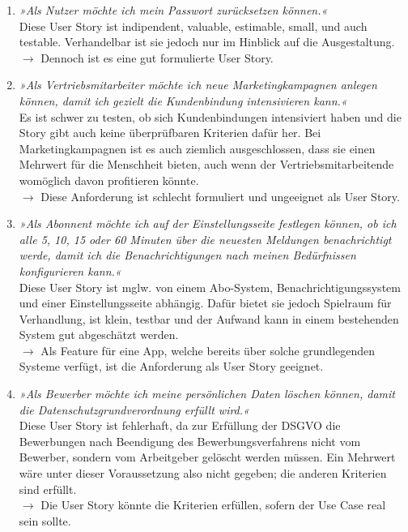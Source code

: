 \documentclass[main.tex]{subfiles}
\begin{document}
\begin{enumerate}
    \item \textit{»Als Nutzer möchte ich mein Passwort zurücksetzen können.«} \\
    Diese User Story ist indipendent, valuable, estimable, small, und auch testable. Verhandelbar ist sie jedoch nur im Hinblick auf die Ausgestaltung. \\
    $\rightarrow$ Dennoch ist es eine gut formulierte User Story.

    \item \textit{»Als Vertriebsmitarbeiter möchte ich neue Marketingkampagnen anlegen können, damit ich gezielt die Kundenbindung intensivieren kann.«}\\
    Es ist schwer zu testen, ob sich Kundenbindungen intensiviert haben und die Story gibt auch keine überprüfbaren Kriterien dafür her. Bei Marketingkampagnen ist es auch ziemlich ausgeschlossen, dass sie einen Mehrwert für die Menschheit bieten, auch wenn der Vertriebsmitarbeitende womöglich davon profitieren könnte.\\
    $\rightarrow$ Diese Anforderung ist schlecht formuliert und ungeeignet als User Story.

    \item \textit{»Als Abonnent möchte ich auf der Einstellungsseite festlegen können, ob ich alle 5, 10, 15 oder 60 Minuten über die neuesten Meldungen benachrichtigt werde, damit ich die Benachrichtigungen nach meinen Bedürfnissen konfigurieren kann.«} \\
    Diese User Story ist mglw. von einem Abo-System, Benachrichtigungssystem und einer Einstellungsseite abhängig. Dafür bietet sie jedoch Spielraum für Verhandlung, ist klein, testbar und der Aufwand kann in einem bestehenden System gut abgeschätzt werden. \\
    $\rightarrow$ Als Feature für eine App, welche bereits über solche grundlegenden Systeme verfügt, ist die Anforderung als User Story geeignet.


    \item \textit{»Als Bewerber möchte ich meine persönlichen Daten löschen können, damit die Datenschutzgrundverordnung erfüllt wird.«}\\
    Diese User Story ist fehlerhaft, da zur Erfüllung der DSGVO die Bewerbungen nach Beendigung des Bewerbungsverfahrens nicht vom Bewerber, sondern vom Arbeitgeber gelöscht werden müssen. Ein Mehrwert wäre unter dieser Voraussetzung also nicht gegeben; die anderen Kriterien sind erfüllt. \\
    $\rightarrow$ Die User Story könnte die Kriterien erfüllen, sofern der Use Case real sein sollte.


\end{enumerate}
\end{document}
